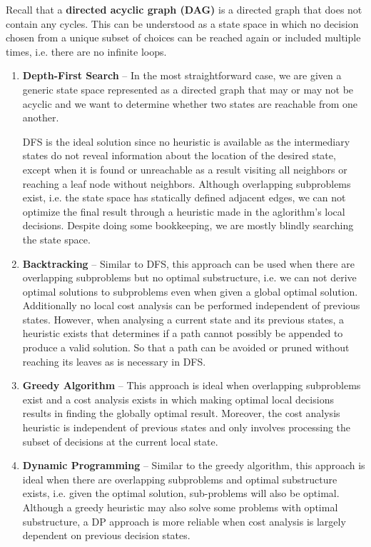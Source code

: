 \documentclass{article}
\begin{document}
    Recall that a \textbf{directed acyclic graph (DAG)} is a directed graph that does not contain any cycles. This can be understood as a state space in which no decision chosen from a unique subset of choices can be reached again or included multiple times, i.e. there are no infinite loops.
    
    \begin{enumerate}
        \item \textbf{Depth-First Search} --
        In the most straightforward case, we are given a generic state space represented as a directed graph that may or may not be acyclic and we want to determine  whether two states are reachable from one another. 
        
        DFS is the ideal solution since no heuristic is available as the intermediary states do not reveal information about the location of the desired state, except when it is found or unreachable as a result visiting all neighbors or reaching a leaf node without neighbors. Although overlapping subproblems exist, i.e. the state space has statically defined adjacent edges, we can not optimize the final result through a heuristic made in the aglorithm's local decisions. Despite doing some bookkeeping, we are mostly blindly searching the state space.
        
        \item \textbf{Backtracking} -- Similar to DFS, this approach can be used when there are overlapping subproblems but no optimal substructure, i.e. we can not derive optimal solutions to subproblems even when given a global optimal solution. Additionally no local cost analysis can be performed independent of previous states. However, when analysing a current state and its previous states, a heuristic exists that determines if a path cannot possibly be appended to produce a valid solution. So that a path can be avoided or pruned without reaching its leaves as is necessary in DFS.
        
        \item \textbf{Greedy Algorithm} -- This approach is ideal when overlapping subproblems exist and a cost analysis exists in which making optimal local decisions results in finding the globally optimal result. Moreover, the cost analysis heuristic is independent of previous states and only involves processing the subset of decisions at the current local state.

        \item \textbf{Dynamic Programming} --  Similar to the greedy algorithm, this approach is ideal when there are overlapping subproblems and optimal substructure exists, i.e. given the optimal solution, sub-problems will also be optimal. Although a greedy heuristic may also solve some problems with optimal substructure, a DP approach is more reliable when cost analysis is largely dependent on previous decision states.

    \end{enumerate}
    
\end{document}
